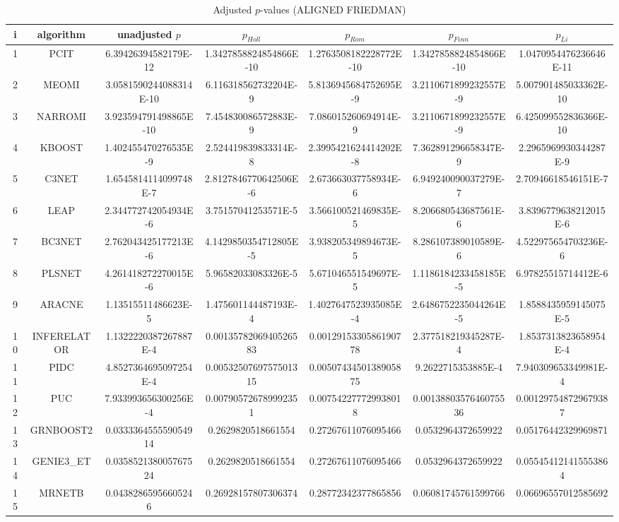 \documentclass[a4paper,10pt]{article}
\begin{document}
\begin{landscape}
\begin{table}[!htp]
\centering\scriptsize
\caption{Adjusted $p$-values (ALIGNED FRIEDMAN)}
\begin{tabular}{ccccccc}
i&algorithm&unadjusted $p$&$p_{Holl}$&$p_{Rom}$&$p_{Finn}$&$p_{Li}$\\
\hline
1&PCIT&6.39426394582179E-12&1.3427858824854866E-10&1.2763508182228772E-10&1.3427858824854866E-10&1.0470954476236646E-11\\
2&MEOMI&3.0581590244088314E-10&6.116318562732204E-9&5.8136945684752695E-9&3.2110671899232557E-9&5.007901485033362E-10\\
3&NARROMI&3.923594791498865E-10&7.454830086572883E-9&7.086015260694914E-9&3.2110671899232557E-9&6.425099552836366E-10\\
4&KBOOST&1.402455470276535E-9&2.524419839833314E-8&2.3995421624414202E-8&7.362891296658347E-9&2.2965969930344287E-9\\
5&C3NET&1.6545814114099748E-7&2.8127846770642506E-6&2.673663037758934E-6&6.949240090037279E-7&2.70946618546151E-7\\
6&LEAP&2.344772742054934E-6&3.75157041253571E-5&3.566100521469835E-5&8.206680543687561E-6&3.8396779638212015E-6\\
7&BC3NET&2.762043425177213E-6&4.1429850354712805E-5&3.938205349894673E-5&8.286107389010589E-6&4.522975654703236E-6\\
8&PLSNET&4.261418272270015E-6&5.96582033083326E-5&5.671046551549697E-5&1.1186184233458185E-5&6.97825515714412E-6\\
9&ARACNE&1.13515511486623E-5&1.475601144487193E-4&1.4027647523935085E-4&2.6486752235044264E-5&1.8588435959145075E-5\\
10&INFERELATOR&1.1322220387267887E-4&0.0013578206940526583&0.0012915330586190778&2.377518219345287E-4&1.8537313823658954E-4\\
11&PIDC&4.8527364695097254E-4&0.0053250769757501315&0.0050743450138905875&9.2622715353885E-4&7.940309653349981E-4\\
12&PUC&7.933993656300256E-4&0.007905726789992351&0.007542277729938018&0.0013880357646075536&0.001297548729679387\\
13&GRNBOOST2&0.033336455559054914&0.2629820518661554&0.27267611076095466&0.0532964372659922&0.05176442329969871\\
14&GENIE3_ET&0.035852138005767524&0.2629820518661554&0.27267611076095466&0.0532964372659922&0.055454121415553864\\
15&MRNETB&0.04382865956605246&0.26928157807306374&0.28772342377865856&0.06081745761599766&0.06696557012585692\\

\end{tabular}
\end{table}
\end{landscape}
\end{document}
